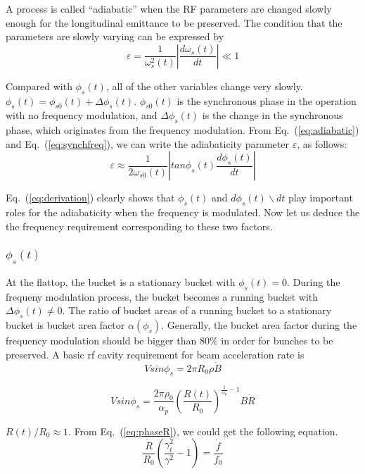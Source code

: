 A process is called “adiabatic” when the RF parameters are changed slowly enough for the longitudinal emittance to be preserved. The condition that the parameters are slowly varying can be expressed by
\begin{equation}
\varepsilon=\frac{1}{\omega_s^2(t)}|\frac{d\omega_s(t)}{dt}| \ll 1
\label{eq:adiabaticity}
\end{equation} 

Compared with $\phi_s(t)$, all of the other variables change very slowly. $\phi_s(t)=\phi_{s0}(t)+\Delta\phi_s(t)$. $\phi_{s0}(t)$ is the synchronous phase in the operation with no frequency modulation, and $\Delta \phi_s(t)$ is the change in the synchronous phase, which originates from the frequency modulation. From Eq.~(\ref{eq:adiabatic}) and Eq.~(\ref{eq:synchfreq}), we can write the adiabaticity parameter $\varepsilon$, as follows:
\begin{equation}
\varepsilon \approx \frac{1}{2\omega_{s0}(t)}|tan\phi_{s}(t)\frac{d\phi_s(t)}{dt}|
\label{eq:derivation}
\end{equation} 

Eq.~(\ref{eq:derivation}) clearly shows that $\phi_s(t)$ and $d\phi_s(t)\backslash dt$ play important roles for the adiabaticity when the frequency is modulated. Now let us deduce the the frequency requirement corresponding to these two factors. 

\subsubsection{$\phi_s(t)$}
At the flattop, the bucket is a stationary bucket with $\phi_s(t)=0$. During the frequeny modulation process, the bucket becomes a running bucket with $\Delta\phi_s(t)\ne0$. The ratio of bucket areas of a running bucket to a stationary bucket is bucket area factor $\alpha(\phi_s)$. Generally, the bucket area factor during the frequency modulation should be bigger than 80\% in order for bunches to be preserved.
A basic rf cavity requirement for beam acceleration rate is
\begin{equation}
Vsin\phi_s=2\pi R_0\rho\dot{B} 
\label{eq:bucktsizeB}
\end{equation} 

\begin{equation}
Vsin\phi_s=\frac{2\pi \rho _0}{\alpha_p}(\frac{R(t)}{R_0})^{\frac{1}{\alpha_p}-1}B\dot R 
\label{eq:bucketsizeR}
\end{equation}

$R(t)/ R_0\approx 1$. From Eq.~(\ref{eq:phaseR}), we could get the following equation.
\begin{equation}
\frac{\dot R}{R_0}(\frac{\gamma_t^2}{\gamma^2}-1)=\frac{\dot f}{f_0} 
\label{eq:RtoF}
\end{equation}

